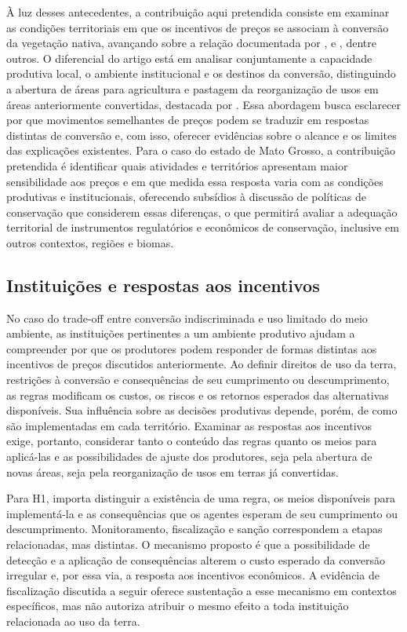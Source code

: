 À luz desses antecedentes, a contribuição aqui pretendida consiste em examinar as condições territoriais em que os incentivos de preços se associam à conversão da vegetação nativa, avançando sobre a relação documentada por ,  e , dentre outros. O diferencial do artigo está em analisar conjuntamente a capacidade produtiva local, o ambiente institucional e os destinos da conversão, distinguindo a abertura de áreas para agricultura e pastagem da reorganização de usos em áreas anteriormente convertidas, destacada por . Essa abordagem busca esclarecer por que movimentos semelhantes de preços podem se traduzir em respostas distintas de conversão e, com isso, oferecer evidências sobre o alcance e os limites das explicações existentes. Para o caso do estado de Mato Grosso, a contribuição pretendida é identificar quais atividades e territórios apresentam maior sensibilidade aos preços e em que medida essa resposta varia com as condições produtivas e institucionais, oferecendo subsídios à discussão de políticas de conservação que considerem essas diferenças, o que permitirá avaliar a adequação territorial de instrumentos regulatórios e econômicos de conservação, inclusive em outros contextos, regiões e biomas.

\subsection{Instituições e respostas aos incentivos}

No caso do trade-off entre conversão indiscriminada e uso limitado do meio ambiente, as instituições pertinentes a um ambiente produtivo ajudam a compreender por que os produtores podem responder de formas distintas aos incentivos de preços discutidos anteriormente. Ao definir direitos de uso da terra, restrições à conversão e consequências de seu cumprimento ou descumprimento, as regras modificam os custos, os riscos e os retornos esperados das alternativas disponíveis. Sua influência sobre as decisões produtivas depende, porém, de como são implementadas em cada território. Examinar as respostas aos incentivos exige, portanto, considerar tanto o conteúdo das regras quanto os meios para aplicá-las e as possibilidades de ajuste dos produtores, seja pela abertura de novas áreas, seja pela reorganização de usos em terras já convertidas.

Para H1, importa distinguir a existência de uma regra, os meios disponíveis para implementá-la e as consequências que os agentes esperam de seu cumprimento ou descumprimento. Monitoramento, fiscalização e sanção correspondem a etapas relacionadas, mas distintas. O mecanismo proposto é que a possibilidade de detecção e a aplicação de consequências alterem o custo esperado da conversão irregular e, por essa via, a resposta aos incentivos econômicos. A evidência de fiscalização discutida a seguir oferece sustentação a esse mecanismo em contextos específicos, mas não autoriza atribuir o mesmo efeito a toda instituição relacionada ao uso da terra.

